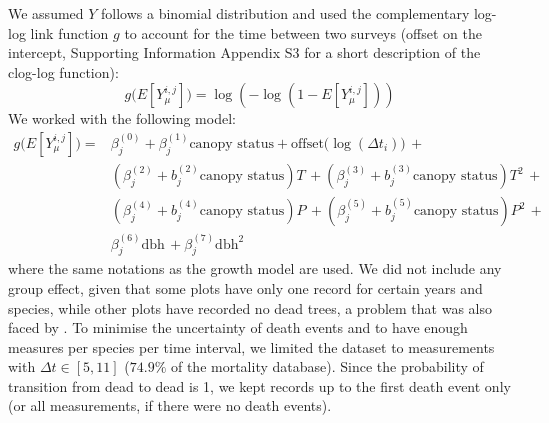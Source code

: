 We assumed $ Y $ follows a binomial distribution and used the complementary log-log link function $ g $ to account for the time between two surveys (offset on the intercept, Supporting Information Appendix S3 for a short description of the clog-log function):
\[
	g \big(E[Y_\mu^{i, j}] \big) = \log \left( -\log(1 - E[Y_\mu^{i, j}]) \right)
\]
We worked with the following model:
\begin{equation}\label{eq::glmm_mortality}
\begin{split}
	g \big(E[Y_\mu^{i, j}] \big) = & \beta_{j}^{(0)}  + \beta_j^{(1)}  \text{canopy status} +
		\text{offset}\big(\log(\Delta t_i) \big) \, + \\
	& \left(\beta_j^{(2)} + b_j^{(2)} \text{canopy status} \right) T \, +
	\left(\beta_j^{(3)} + b_j^{(3)} \text{canopy status} \right) T^2 \, + \\
	& \left(\beta_j^{(4)} + b_j^{(4)} \text{canopy status} \right) P \, +
	\left(\beta_j^{(5)} + b_j^{(5)} \text{canopy status} \right) P^2 \, + \\
	& \beta_j^{(6)} \text{dbh} \, + \beta_j^{(7)} \text{dbh}^2
\end{split}
\end{equation}
where the same notations as the growth model are used. We did not include any group effect, given that some plots have only one record for certain years and species, while other plots have recorded no dead trees, a problem that was also faced by \citet{Kunstler2019}. To minimise the uncertainty of death events and to have enough measures per species per time interval, we limited the dataset to measurements with $ \Delta t \in [5, 11] $ ($ 74.9 \% $ of the mortality database). Since the probability of transition from dead to dead is 1, we kept records up to the first death event only (or all measurements, if there were no death events). \\


